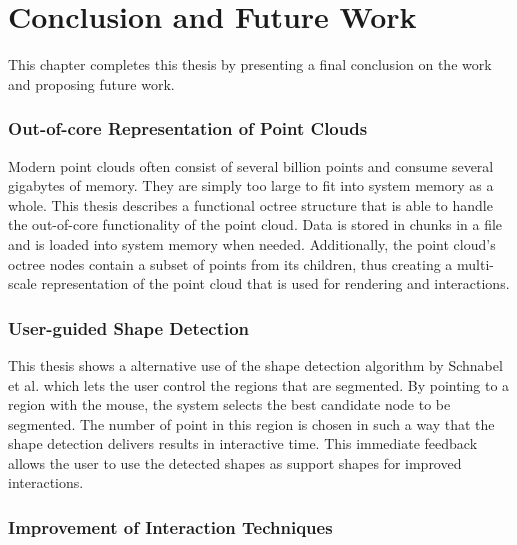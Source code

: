 \chapter{Conclusion and Future Work}
\label{chap:conclusion}


This chapter completes this thesis by presenting a final conclusion on the work and proposing future work.

\subsection{Out-of-core Representation of Point Clouds}

Modern point clouds often consist of several billion points and consume several gigabytes of memory. They are simply too large to fit into system memory as a whole. This thesis describes a functional octree structure that is able to handle the out-of-core functionality of the point cloud. Data is stored in chunks in a file and is loaded into system memory when needed. Additionally, the point cloud's octree nodes contain a subset of points from its children, thus creating a multi-scale representation of the point cloud that is used for rendering and interactions. 


\subsection{User-guided Shape Detection}

This thesis shows a alternative use of the shape detection algorithm by Schnabel et al.\cite{schnabel-2007-efficient} which lets the user control the regions that are segmented. By pointing to a region with the mouse, the system selects the best candidate node to be segmented. The number of point in this region is chosen in such a way that the shape detection delivers results in interactive time. This immediate feedback allows the user to use the detected shapes as support shapes for improved interactions. 


\subsection{Improvement of Interaction Techniques}

